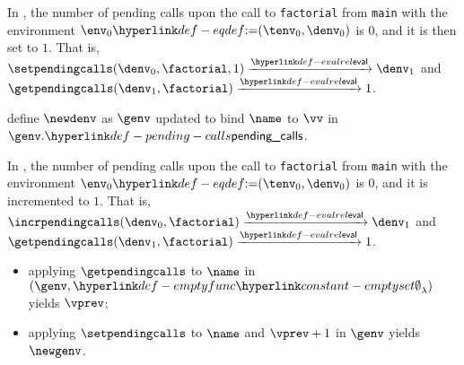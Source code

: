 In , the number of pending calls upon the call to \verb|factorial| from \verb|main|
with the environment $\env_0 \eqdef (\tenv_0, \denv_0)$ is $0$, and it is then set to $1$.
That is, \\
$\setpendingcalls(\denv_0, \factorial, 1) \evalarrow \denv_1$
and\\
$\getpendingcalls(\denv_1, \factorial) \evalarrow 1$.

\ProseParagraph
define $\newdenv$ as $\genv$ updated to bind $\name$ to $\vv$ in $\genv.\pendingcalls$.

\FormallyParagraph
\begin{mathpar}
\end{mathpar}


In , the number of pending calls upon the call to \verb|factorial| from \verb|main|
with the environment $\env_0 \eqdef (\tenv_0, \denv_0)$ is $0$, and it is incremented to $1$.
That is, \\
$\incrpendingcalls(\denv_0, \factorial) \evalarrow \denv_1$
and\\
$\getpendingcalls(\denv_1, \factorial) \evalarrow 1$.

\ProseParagraph
\AllApply
\begin{itemize}
  \item applying $\getpendingcalls$ to $\name$ in $(\genv, \emptyfunc)$ yields $\vprev$;
  \item applying $\setpendingcalls$ to $\name$ and $\vprev + 1$ in $\genv$ yields $\newgenv$.
\end{itemize}

\FormallyParagraph
\begin{mathpar}
\end{mathpar}

